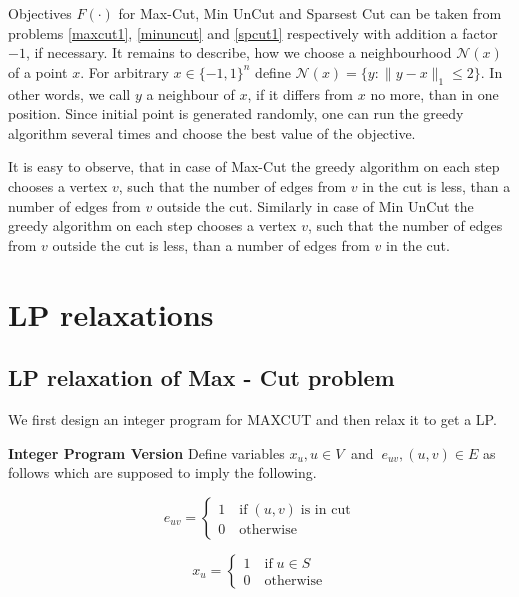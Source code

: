 \documentclass[12pt]{article}
\begin{document}
Objectives $F(\cdot)$ for Max-Cut, Min UnCut and Sparsest Cut can be taken from 
problems \ref{maxcut1}, \ref{minuncut} and \ref{spcut1}  respectively with addition a 
factor $-1$, if necessary.
It remains to describe, how we choose a neighbourhood $\mathcal N(x)$ of a point $x$.
For arbitrary $x \in \{-1, 1 \}^n$ define $\mathcal N(x) = \{ y : \| y - x \|_1 \leq 2 \}$.
In other words, we call $y$ a neighbour of $x$, if it differs from $x$ no more, than in one 
position.
Since initial point is generated randomly, one can run the greedy algorithm several times 
and choose the best value of the objective.

It is easy to observe, that in case of Max-Cut the greedy algorithm on each step chooses 
a vertex $v$, such that the number of edges from $v$ in the cut is less, than a number of 
edges from $v$ outside the cut.
Similarly in case of Min UnCut the greedy algorithm on each step chooses 
a vertex $v$, such that the number of edges from $v$ outside the cut is less, than a 
number of edges from $v$ in the cut.


\section{LP relaxations}

\subsection{LP relaxation of Max - Cut problem}

We first design an integer program for MAXCUT and then relax it to get a LP.

\textbf{Integer Program Version} Define variables $x_u, u \in V \ $ and $\ e_{uv}, (u,v) \in 
E$ as follows
which are supposed to imply the following.

\begin{equation}
e_{uv} =
\label{primal}
\begin{cases}
1 \quad \text{if} \; (u, v) \; \text{is in cut} \\
0 \quad \text{otherwise} 
\end{cases}
\end{equation}

\begin{equation}
x_u =
\label{primal}
\begin{cases}
1 \quad \text{if} \; u \in S\\
0 \quad \text{otherwise} 
\end{cases}
\end{equation}
\end{document}
